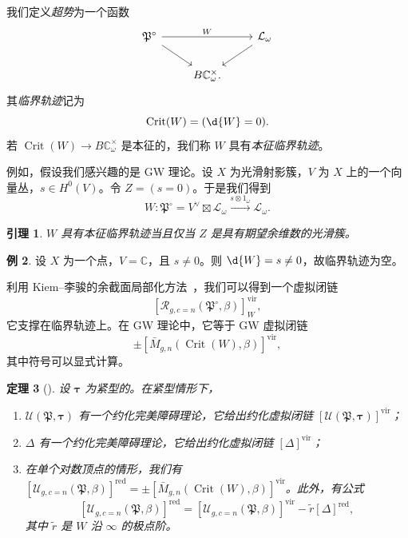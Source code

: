 \documentclass{amsart}
\newtheorem{thm}{定理}[section]
\newtheorem{lem}[thm]{引理}
\theoremstyle{definition}
\newtheorem{exm}[thm]{例}
\theoremstyle{remark}
\theoremstyle{plain}
\theoremstyle{definition}
\theoremstyle{remark}
\newcommand{\C}{\mathbb{C}}
\newcommand{\mc}[1]{\mathcal{#1}}
\newcommand{\mf}[1]{\mathfrak{#1}}
\newcommand{\mr}[1]{\mathrm{#1}}
\newcommand{\on}[1]{\operatorname{#1}}
\newcommand{\1}{\mathbf{1}}
\newcommand{\2}{\mathbf{2}}
\newcommand{\3}{\mathbf{3}}
\newcommand{\vir}{\mr{vir}}
\begin{document}
我们定义\textit{超势}为一个函数
\begin{equation*}
\begin{tikzcd}
    \mf{P}^{\circ} \ar{rr}{W} \ar{dr} && \mc{L}_{\omega} \ar{dl} \\
    & B \C_{\omega}^{\times}.
\end{tikzcd}
\end{equation*}
其\textit{临界轨迹}记为
\[ \on{Crit}(W) = (\d{W} = 0). \]
若 \(\on{Crit}(W) \to B\C_{\omega}^{\times}\) 是本征的，我们称 \(W\) 具有\textit{本征临界轨迹}。

例如，假设我们感兴趣的是 GW 理论。设 \(X\) 为光滑射影簇，\(V\) 为 \(X\) 上的一个向量丛，\(s \in H^0(V)\)。令 \(Z = (s = 0)\)。于是我们得到
\[ W \colon \mf{P}^{\circ} = V^{\vee} \boxtimes \mc{L}_{\omega} \xrightarrow{s \otimes 1_{\omega}} \mc{L}_{\omega}. \]

\begin{lem}
    \(W\) 具有本征临界轨迹当且仅当 \(Z\) 是具有期望余维数的光滑簇。
\end{lem}

\begin{exm}
    设 \(X\) 为一个点，\(V = \C\)，且 \(s \neq 0\)。则 \(\d{W} = s \neq 0\)，故临界轨迹为空。
\end{exm}

利用 Kiem–李骏的余截面局部化方法~\cite{KiemLi2013}，我们可以得到一个虚拟闭链
\[ [\mc{R}_{g, c=n}(\mf{P}^{\circ}, \beta)]_W^{\vir}, \]
它支撑在临界轨迹上。在 GW 理论中，它等于 GW 虚拟闭链
\[ \pm [\bar{M}_{g,n}(\on{Crit}(W), \beta)]^{\vir}, \]
其中符号可以显式计算。

\begin{thm}[{\cite{CJR2021,CJW2021}}]
    设 \(\bm{\tau}\) 为紧型的。在紧型情形下，
    \begin{enumerate}
        \item \(\mc{U}(\mf{P}, \bm{\tau})\) 有一个约化完美障碍理论，它给出约化虚拟闭链 \([\mc{U}(\mf{P}, \bm{\tau})]^{\vir}\)；
        \item \(\Delta\) 有一个约化完美障碍理论，它给出约化虚拟闭链 \([\Delta]^{\vir}\)；
        \item 在单个对数顶点的情形，我们有 \([\mc{U}_{g, c=n}(\mf{P}, \beta)]^{\on{red}} = \pm [\bar{M}_{g,n}(\on{Crit}(W), \beta)]^{\vir}\)。此外，有公式
            \[ [\mc{U}_{g, c=n}(\mf{P}, \beta)]^{\on{red}} = [\mc{U}_{g, c=n}(\mf{P}, \beta)]^{\vir} - \tilde{r} [\Delta]^{\on{red}}, \]
            其中 \(\tilde{r}\) 是 \(W\) 沿 \(\infty\) 的极点阶。
    \end{enumerate}
\end{thm}
\end{document}
